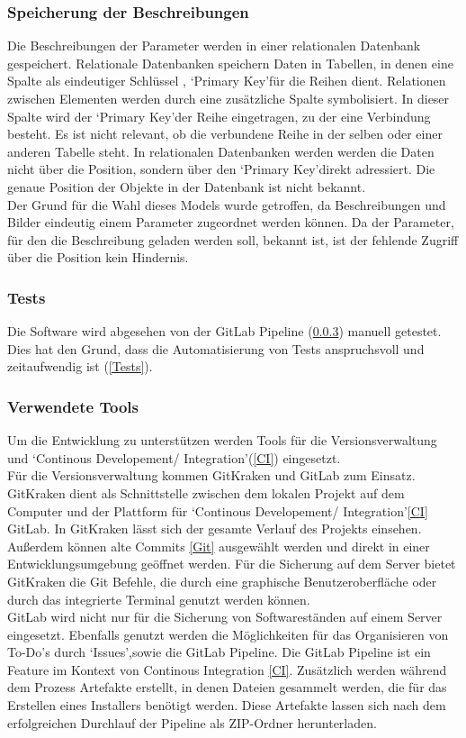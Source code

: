\subsubsection{Speicherung der Beschreibungen}
Die Beschreibungen der Parameter werden in einer relationalen Datenbank gespeichert. Relationale Datenbanken speichern Daten in Tabellen, in denen eine Spalte als eindeutiger Schlüssel , \lq Primary Key\rq\space für die Reihen dient. Relationen zwischen Elementen werden durch eine zusätzliche Spalte symbolisiert. In dieser Spalte wird der \lq Primary Key\rq\space der Reihe eingetragen, zu der eine Verbindung besteht. Es ist nicht relevant, ob die verbundene Reihe in der selben oder einer anderen Tabelle steht. In relationalen Datenbanken werden werden die Daten nicht über die Position, sondern über den \lq Primary Key\rq\space direkt adressiert. Die genaue Position der Objekte in der Datenbank ist nicht bekannt\cite{10.1145/1283920.1283937}.\\
Der Grund für die Wahl dieses Models wurde getroffen, da Beschreibungen und Bilder eindeutig einem Parameter zugeordnet werden können. Da der Parameter, für den die Beschreibung geladen werden soll, bekannt ist, ist der fehlende Zugriff über die Position kein Hindernis.
\subsubsection{Tests}
Die Software wird abgesehen von der GitLab Pipeline (\ref{Tools}) manuell getestet. Dies hat den Grund, dass die Automatisierung von Tests anspruchsvoll und zeitaufwendig ist (\ref{Tests}).
\subsubsection{Verwendete Tools}
\label{Tools}
Um die Entwicklung zu unterstützen werden Tools für die Versionsverwaltung und \lq Continous Developement/ Integration\rq\space (\ref{CI}) eingesetzt.\\
Für die Versionsverwaltung kommen GitKraken und GitLab zum Einsatz. GitKraken dient als Schnittstelle zwischen dem lokalen Projekt auf dem Computer und der Plattform für \lq Continous Developement/ Integration\rq\space \ref{CI} GitLab. In GitKraken lässt sich der gesamte Verlauf des Projekts einsehen. Außerdem können alte Commits \ref{Git} ausgewählt werden und direkt in einer Entwicklungsumgebung geöffnet werden. Für die Sicherung auf dem Server bietet GitKraken die Git Befehle, die durch eine graphische Benutzeroberfläche oder durch das integrierte Terminal genutzt werden können.\\
GitLab wird nicht nur für die Sicherung von Softwareständen auf einem Server eingesetzt. Ebenfalls genutzt werden die Möglichkeiten für das Organisieren von To-Do's durch \lq Issues\rq ,\space sowie die GitLab Pipeline. Die GitLab Pipeline ist ein Feature im Kontext von Continous Integration \ref{CI}. Zusätzlich werden während dem Prozess Artefakte erstellt, in denen Dateien gesammelt werden, die für das Erstellen eines Installers benötigt werden. Diese Artefakte lassen sich nach dem erfolgreichen Durchlauf der Pipeline als ZIP-Ordner herunterladen.\\ 

